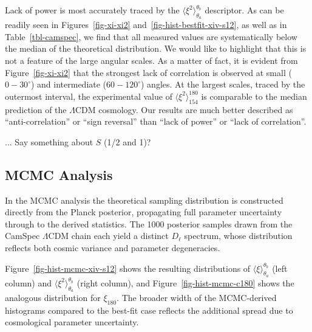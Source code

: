 \documentclass[apj,twocolumn,numberedappendix]{openjournal}
\begin{document}
Lack of power is most accurately traced by the $\langle \xi^2 \rangle_{\theta_a}^{\theta_b}$ descriptor.
As can be readily seen in Figures~\ref{fig-xi-xi2} and~\ref{fig-hist-bestfit-xiv-s12}, as well as in Table~\ref{tbl-camspec}, we find that all measured values are systematically below the median of the theoretical distribution.
We would like to highlight that this is not a feature of the large angular scales.
As a matter of fact, it is evident from Figure~\ref{fig-xi-xi2} that the strongest lack of correlation is observed at small ($0-30^\circ$) and intermediate ($60-120^\circ$) angles.
At the largest scales, traced by the outermost interval, the experimental value of $\langle \xi^2 \rangle_{154}^{180}$ is comparable to the median prediction of the $\Lambda$CDM cosmology.
Our results are much better described as ``anti-correlation'' or ``sign reversal'' than ``lack of power'' or ``lack of correlation''.

... Say something about $S$ (1/2 and 1)?


\subsection{MCMC Analysis}\label{sec-mcmc}

In the MCMC analysis the theoretical sampling distribution is
constructed directly from the Planck posterior, propagating full
parameter uncertainty through to the derived statistics. The 1000
posterior samples drawn from the CamSpec $\Lambda$CDM chain each yield
a distinct $D_\ell$ spectrum, whose distribution reflects both cosmic
variance and parameter degeneracies.

Figure~\ref{fig-hist-mcmc-xiv-s12} shows the resulting distributions of
$\langle\xi\rangle_{\theta_a}^{\theta_b}$ (left column) and
$\langle\xi^2\rangle_{\theta_a}^{\theta_b}$ (right column), and
Figure~\ref{fig-hist-mcmc-c180} shows the analogous distribution for
$\xi_{180}$. The broader width of the MCMC-derived histograms compared
to the best-fit case reflects the additional spread due to cosmological
parameter uncertainty.
\end{document}
